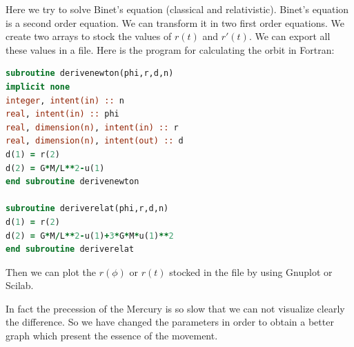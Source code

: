 Here we try to solve Binet's equation (classical and relativistic). Binet's equation is a second order equation. We can transform it in two first order equations. We create two arrays to stock the values of $r\left(t \right) $ and $r'\left( t\right) $. We can export all these values in a file. Here is the program for calculating the orbit in Fortran:
\begin{lstlisting}[language=Fortran,basicstyle=\small\ttfamily]
subroutine derivenewton(phi,r,d,n)
implicit none
integer, intent(in) :: n
real, intent(in) :: phi
real, dimension(n), intent(in) :: r
real, dimension(n), intent(out) :: d
d(1) = r(2)
d(2) = G*M/L**2-u(1)
end subroutine derivenewton

subroutine deriverelat(phi,r,d,n)
d(1) = r(2)
d(2) = G*M/L**2-u(1)+3*G*M*u(1)**2
end subroutine deriverelat
\end{lstlisting}

Then we can plot the $r(\phi)$ or $r(t)$ stocked in the file by using Gnuplot or Scilab.

In fact the precession of the Mercury is so slow that we can not visualize clearly the difference. So we have changed the parameters in order to obtain a better graph which present the essence of the movement.


